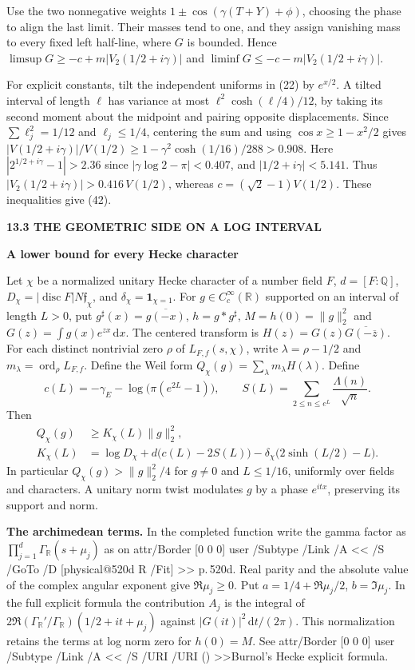 \documentclass[11pt,letterpaper]{article}
\makeatletter
\newcommand{\rightmarktext}{}
\newcommand{\printfolio}{}
\newcommand{\leaf}[4]{\clearpage\gdef\printfolio{#1}\gdef\rightmarktext{#2}%
  {\small\sffamily\bfseries\color{ink}#3\par}\vspace{3pt}%
  {\LARGE\bfseries #4\par}\vspace{5pt}}
\newcommand{\point}[1]{\par\smallskip\textbf{#1.}\enspace\ignorespaces}
\newcommand{\R}{\mathbb R}
\newcommand{\Q}{\mathbb Q}
\newcommand{\dd}{\,\mathrm d}
\newcommand{\citetitle}[2]{\leavevmode\pdfstartlink attr{/Border [0 0 0]} user{%
 /Subtype /Link /A << /S /URI /URI (\pdfescapestring{\detokenize{#1}}) >>}{\color{ink}#2}\pdfendlink}
\newcommand{\MusicPDFPageRef}[1]{\pdfpageref\csname physical@#1\endcsname\space\space 0 R}
\newcommand{\pagelink}[2]{\leavevmode\pdfstartlink attr{/Border [0 0 0]} user{%
  /Subtype /Link /A << /S /GoTo /D [\MusicPDFPageRef{#1} /Fit] >>}%
  {\color{ink}#2}\pdfendlink}
\newcommand{\pg}[1]{\pagelink{#1}{p.\,#1}}
\makeatother
\begin{document}
Use the two nonnegative weights $1\pm\cos(\gamma(T+Y)+\phi)$, choosing
the phase to align the last limit. Their masses tend to one, and they
assign vanishing mass to every fixed left half-line, where $G$ is
bounded. Hence $\limsup G\ge-c+m|V_2(1/2+i\gamma)|$ and
$\liminf G\le-c-m|V_2(1/2+i\gamma)|$.

For explicit constants, tilt the independent uniforms in (22) by
$e^{x/2}$. A tilted interval of length $\ell$ has variance at most
$\ell^2\cosh(\ell/4)/12$, by taking its second moment about the
midpoint and pairing opposite displacements. Since $\sum\ell_j^2=1/12$
and $\ell_j\le1/4$, centering the sum and using
$\cos x\ge1-x^2/2$ gives
$|V(1/2+i\gamma)|/V(1/2)\ge1-\gamma^2\cosh(1/16)/288>0.908$.
Here $|2^{1/2+i\gamma}-1|>2.36$ since
$|\gamma\log2-\pi|<0.407$, and $|1/2+i\gamma|<5.141$.
Thus $|V_2(1/2+i\gamma)|>0.416\,V(1/2)$, whereas
$c=(\sqrt2-1)V(1/2)$. These inequalities give (42).

\leaf{522w}{Weil positivity}{13.3 \quad THE GEOMETRIC SIDE ON A LOG INTERVAL}{A lower bound for every Hecke character}
Let $\chi$ be a normalized unitary Hecke character of a number field $F$,
$d=[F:\Q]$, $D_\chi=|\operatorname{disc}F|N\mathfrak f_\chi$,
and $\delta_\chi=\mathbf1_{\chi=1}$. For $g\in C_c^\infty(\R)$ supported
on an interval of length $L>0$, put $g^\sharp(x)=\overline{g(-x)}$,
$h=g*g^\sharp$, $M=h(0)=\|g\|_2^2$ and $G(z)=\int g(x)e^{zx}\dd x$.
The centered transform is $H(z)=G(z)\overline{G(-\overline z)}$.
For each distinct nontrivial zero $\rho$ of $L_{F,f}(s,\chi)$, write
$\lambda=\rho-1/2$ and $m_\lambda=\operatorname{ord}_\rho L_{F,f}$. Define the Weil form
$Q_\chi(g)=\sum_\lambda m_\lambda H(\lambda)$. Define
\[
 c(L)=-\gamma_E-\log\!\big(\pi(e^{2L}-1)\big),\qquad
 S(L)=\sum_{2\le n\le e^L}\frac{\Lambda(n)}{\sqrt n}.
\]
Then
\begin{align*}
 Q_\chi(g)&\ge K_\chi(L)\|g\|_2^2,\\
 K_\chi(L)&=\log D_\chi+d\big(c(L)-2S(L)\big)
              -\delta_\chi\big(2\sinh(L/2)-L\big).
 \tag{43}
\end{align*}
In particular $Q_\chi(g)>\|g\|_2^2/4$ for $g\ne0$ and $L\le1/16$,
uniformly over fields and characters. A unitary norm twist modulates
$g$ by a phase $e^{itx}$, preserving its support and norm.

\point{The archimedean terms} In the completed function write the
gamma factor as $\prod_{j=1}^d\Gamma_\R(s+\mu_j)$ as on \pg{520d}.
Real parity and the absolute value of the complex angular exponent
give $\Re\mu_j\ge0$. Put $a=1/4+\Re\mu_j/2$, $b=\Im\mu_j$. In the
full explicit formula the contribution $A_j$ is the integral of
$2\Re(\Gamma_\R'/\Gamma_\R)(1/2+it+\mu_j)$ against
$|G(it)|^2\dd t/(2\pi)$. This normalization retains the terms at log
norm zero for $h(0)=M$. See
\citetitle{https://arxiv.org/abs/math/9902080}{Burnol's Hecke explicit formula}.
\end{document}
